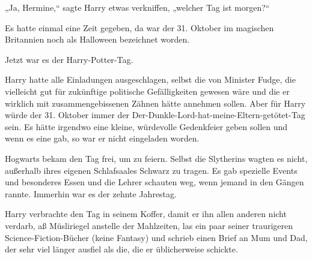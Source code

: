„Ja, Hermine,“ sagte Harry etwas verkniffen, „welcher Tag ist morgen?“


Es hatte einmal eine Zeit gegeben, da war der 31. Oktober im magischen Britannien noch als Halloween bezeichnet worden.

Jetzt war es der Harry-Potter-Tag.

Harry hatte alle Einladungen ausgeschlagen, selbst die von Minister Fudge, die vielleicht gut für zukünftige politische Gefälligkeiten gewesen wäre und die er wirklich mit zusammengebissenen Zähnen hätte annehmen sollen. Aber für Harry würde der 31. Oktober immer der Der-Dunkle-Lord-hat-meine-Eltern-getötet-Tag sein. Es hätte irgendwo eine kleine, würdevolle Gedenkfeier geben sollen und wenn es eine gab, so war er nicht eingeladen worden.

Hogwarts bekam den Tag frei, um zu feiern. Selbst die Slytherins wagten es nicht, außerhalb ihres eigenen Schlafsaales Schwarz zu tragen. Es gab spezielle Events und besonderes Essen und die Lehrer schauten weg, wenn jemand in den Gängen rannte. Immerhin war es der zehnte Jahrestag.

Harry verbrachte den Tag in seinem Koffer, damit er ihn allen anderen nicht verdarb, aß Müsliriegel anstelle der Mahlzeiten, las ein paar seiner traurigeren Science-Fiction-Bücher (keine Fantasy) und schrieb einen Brief an Mum und Dad, der sehr viel länger ausfiel als die, die er üblicherweise schickte.

